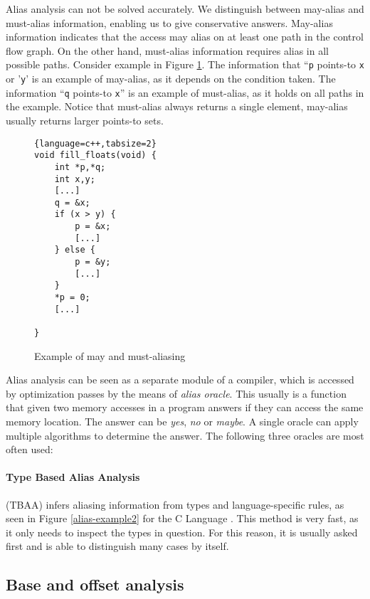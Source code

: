Alias analysis can not be solved accurately.  We distinguish between may-alias
and must-alias information, enabling us to give conservative answers.  May-alias
information indicates that the access may alias on at least one path
in the control flow graph. On the other hand, must-alias information requires
alias in all possible paths. Consider example in Figure
\ref{alias-example-maymust}. The information that ``{\tt p} points-to {\tt x} or
'{\tt y}' is an example of may-alias, as it depends on the condition taken.
The information ``{\tt q} points-to {\tt x}'' is an example of must-alias, as it
holds on all paths in the example. Notice that must-alias always returns a
single element, may-alias usually returns larger points-to sets.

\begin{figure}[h!]
\begin{tcolorbox}
\begin{lstlisting}{language=c++,tabsize=2}
void fill_floats(void) {
	int *p,*q;
	int x,y;
	[...]
	q = &x;
	if (x > y) {
		p = &x;
		[...]
	} else {
		p = &y;
		[...]
	}
	*p = 0;
	[...]
	
}
\end{lstlisting}
\end{tcolorbox}
\caption{Example of may and must-aliasing}
\label{alias-example-maymust}
\end{figure}

Alias analysis can be seen as a separate module of a compiler, which is accessed
by optimization passes by the means of {\it alias oracle}. This usually is a
function that given two memory accesses in a program answers if they can access
the same memory location. The answer can be {\it yes}, {\it no} or {\it maybe}.
A single oracle can apply multiple algorithms to determine the answer. The
following three oracles are most often used:

\label{sec-tbaa}
\paragraph{Type Based Alias Analysis} (TBAA) infers aliasing information from
types and language-specific rules, as seen in Figure \ref{alias-example2} for
the C Language \cite{isoc}. This method is
very fast, as it only needs to inspect the types in question. For this reason,
it is usually asked first and is able to distinguish many cases by itself.

\subsection{Base and offset analysis}
\label{sec-baseoffset}

